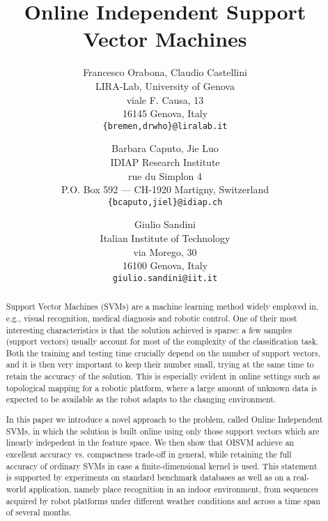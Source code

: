 \documentclass[10pt,twocolumn,letterpaper]{article}
\begin{document}

\title{Online Independent Support Vector Machines}

\author{
Francesco Orabona, Claudio Castellini\\
LIRA-Lab, University of Genova\\
viale F. Causa, 13\\
16145 Genova, Italy\\
{\tt\small \{bremen,drwho\}@liralab.it}
\and
Barbara Caputo, Jie Luo\\
IDIAP Research Institute\\
rue du Simplon 4\\
P.O. Box 592 --- CH-1920 Martigny, Switzerland\\
{\tt\small \{bcaputo,jiel\}@idiap.ch}
\and
Giulio Sandini\\
Italian Institute of Technology\\
via Morego, 30\\
16100 Genova, Italy\\
{\tt\small giulio.sandini@iit.it}
}

\maketitle


\begin{abstract}

  Support Vector Machines (SVMs) are a machine learning method widely
  employed in, e.g., visual recognition, medical diagnosis and robotic
  control. One of their most interesting characteristics is that the
  solution achieved is sparse: a few samples (support vectors) usually
  account for most of the complexity of the classification task. Both
  the training and testing time crucially depend on the number of
  support vectors, and it is then very important to keep their number
  small, trying at the same time to retain the accuracy of the
  solution. This is especially evident in online settings such as
  topological mapping for a robotic platform, where a large amount of
  unknown data is expected to be available as the robot adapts to the
  changing environment.

  In this paper we introduce a novel approach to the problem, called
  Online Independent SVMs, in which the solution is built online using
  only those support vectors which are linearly indepedent in the
  feature space. We then show that OISVM achieve an excellent accuracy
  vs. compactness trade-off in general, while retaining the full
  accuracy of ordinary SVMs in case a finite-dimensional kernel is
  used. This statement is supported by experiments on standard
  benchmark databases as well as on a real-world application, namely
  place recognition in an indoor environment, from sequences acquired
  by robot platforms under different weather conditions and across a
  time span of several months.

\end{abstract}
\end{document}
